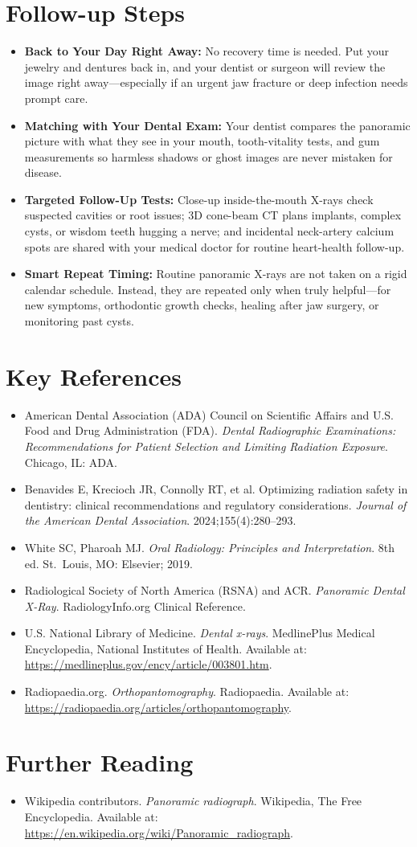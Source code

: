 \section{Follow-up Steps}
\begin{itemize}
\item \textbf{Back to Your Day Right Away:} No recovery time is needed. Put your jewelry and dentures back in, and your dentist or surgeon will review the image right away---especially if an urgent jaw fracture or deep infection needs prompt care.
\item \textbf{Matching with Your Dental Exam:} Your dentist compares the panoramic picture with what they see in your mouth, tooth-vitality tests, and gum measurements so harmless shadows or ghost images are never mistaken for disease.
\item \textbf{Targeted Follow-Up Tests:} Close-up inside-the-mouth X-rays check suspected cavities or root issues; 3D cone-beam CT plans implants, complex cysts, or wisdom teeth hugging a nerve; and incidental neck-artery calcium spots are shared with your medical doctor for routine heart-health follow-up.
\item \textbf{Smart Repeat Timing:} Routine panoramic X-rays are not taken on a rigid calendar schedule. Instead, they are repeated only when truly helpful---for new symptoms, orthodontic growth checks, healing after jaw surgery, or monitoring past cysts.
\end{itemize}

\section{Key References}
\begin{itemize}
\item American Dental Association (ADA) Council on Scientific Affairs and U.S. Food and Drug Administration (FDA). \textit{Dental Radiographic Examinations: Recommendations for Patient Selection and Limiting Radiation Exposure}. Chicago, IL: ADA.
\item Benavides E, Krecioch JR, Connolly RT, et al. Optimizing radiation safety in dentistry: clinical recommendations and regulatory considerations. \textit{Journal of the American Dental Association}. 2024;155(4):280--293.
\item White SC, Pharoah MJ. \textit{Oral Radiology: Principles and Interpretation}. 8th ed. St.~Louis, MO: Elsevier; 2019.
\item Radiological Society of North America (RSNA) and ACR. \textit{Panoramic Dental X-Ray}. RadiologyInfo.org Clinical Reference.
\item U.S. National Library of Medicine. \textit{Dental x-rays}. MedlinePlus Medical Encyclopedia, National Institutes of Health. Available at: \url{https://medlineplus.gov/ency/article/003801.htm}.
\item Radiopaedia.org. \textit{Orthopantomography}. Radiopaedia. Available at: \url{https://radiopaedia.org/articles/orthopantomography}.
\end{itemize}

\section{Further Reading}
\begin{itemize}
  \item Wikipedia contributors. \textit{Panoramic radiograph}. Wikipedia, The Free Encyclopedia. Available at: \url{https://en.wikipedia.org/wiki/Panoramic_radiograph}.
\end{itemize}
